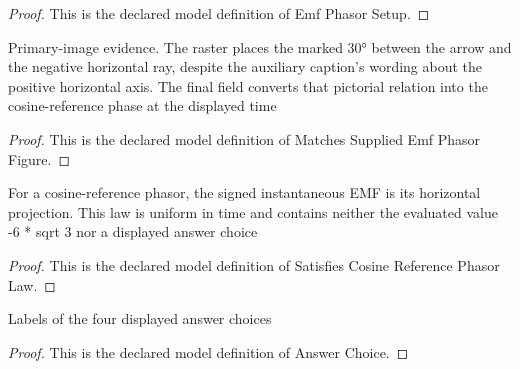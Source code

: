 \begin{proof}
  This is the declared model definition of Emf Phasor Setup.
\end{proof}
\begin{definition}
  \label{def:physics:phyx-mini-0886:phyxminiproblems-problemphyxmini0886-matchessuppliedemfphasorfigure}
  Primary-image evidence. The raster places the marked 30° between the arrow and the negative horizontal ray, despite the auxiliary caption's wording about the positive horizontal axis. The final field converts that pictorial relation into the cosine-reference phase at the displayed time
\end{definition}
\begin{proof}
  This is the declared model definition of Matches Supplied Emf Phasor Figure.
\end{proof}
\begin{definition}
  \label{def:physics:phyx-mini-0886:phyxminiproblems-problemphyxmini0886-satisfiescosinereferencephasorlaw}
  For a cosine-reference phasor, the signed instantaneous EMF is its horizontal projection. This law is uniform in time and contains neither the evaluated value -6 * sqrt 3 nor a displayed answer choice
\end{definition}
\begin{proof}
  This is the declared model definition of Satisfies Cosine Reference Phasor Law.
\end{proof}
\begin{definition}
  \label{def:physics:phyx-mini-0886:phyxminiproblems-problemphyxmini0886-answerchoice}
  Labels of the four displayed answer choices
\end{definition}
\begin{proof}
  This is the declared model definition of Answer Choice.
\end{proof}
